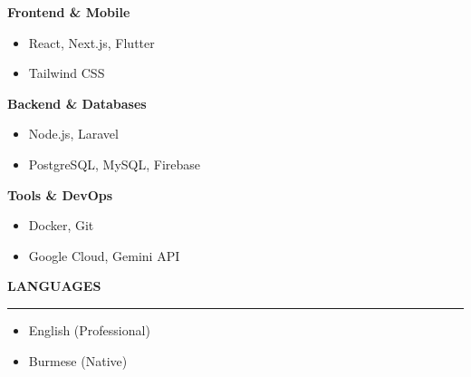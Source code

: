 \documentclass[10pt,a4paper]{article}
\begin{document}
\begin{minipage}[t]{0.3\textwidth}
  \textbf{Frontend \& Mobile}
  \begin{itemize}[leftmargin=12pt,itemsep=1pt,topsep=1pt,parsep=0pt]
    \item \small React, Next.js, Flutter
    \item \small Tailwind CSS
  \end{itemize}
  \vspace{0.2cm}
  
  \textbf{Backend \& Databases}
  \begin{itemize}[leftmargin=12pt,itemsep=1pt,topsep=1pt,parsep=0pt]
    \item \small Node.js, Laravel
    \item \small PostgreSQL, MySQL, Firebase
  \end{itemize}
  \vspace{0.2cm}
  
  \textbf{Tools \& DevOps}
  \begin{itemize}[leftmargin=12pt,itemsep=1pt,topsep=1pt,parsep=0pt]
    \item \small Docker, Git
    \item \small Google Cloud, Gemini API
  \end{itemize}

  \vspace{0.4cm}

  {\large\textbf{\textcolor{mainblue}{\uppercase{Languages}}}}\par
  \noindent\rule{0.9\linewidth}{0.5pt}\par\vspace{0.3cm}
  \begin{itemize}[leftmargin=12pt,itemsep=2pt,topsep=0pt,parsep=0pt]
    \item \small English (Professional)
    \item \small Burmese (Native)
  \end{itemize}

\end{minipage}%
\hfill
\end{document}
